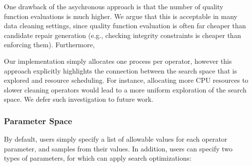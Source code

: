 One drawback of the asychronous approach is that the number of quality function evaluations is much higher. We argue that this is acceptable in many data cleaning settings, since quality function evaluation is often far cheaper than candidate repair generation (e.g., checking integrity constraints is cheaper than enforcing them). Furthermore, 


Our implementation simply allocates one process per operator, however this approach explicitly highlights the connection between the search space that is explored and resource scheduling.  For instance, allocating more CPU resources to slower cleaning operators would lead to a more uniform exploration of the search space.  We defer such investigation to future work.






\subsubsection{Parameter Space}
By default, users simply specify a list of allowable values for each operator parameter, and \sys samples from their values.  In addition, users can specify two types of parameters, for which \sys can apply search optimizations:


